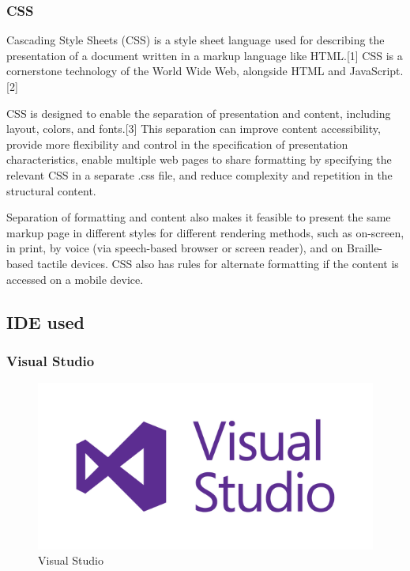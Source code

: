 \subsubsection{CSS}
Cascading Style Sheets (CSS) is a style sheet language used for describing the presentation of a document written in a markup language like HTML.[1] CSS is a cornerstone technology of the World Wide Web, alongside HTML and JavaScript.[2]

CSS is designed to enable the separation of presentation and content, including layout, colors, and fonts.[3] This separation can improve content accessibility, provide more flexibility and control in the specification of presentation characteristics, enable multiple web pages to share formatting by specifying the relevant CSS in a separate .css file, and reduce complexity and repetition in the structural content.

Separation of formatting and content also makes it feasible to present the same markup page in different styles for different rendering methods, such as on-screen, in print, by voice (via speech-based browser or screen reader), and on Braille-based tactile devices. CSS also has rules for alternate formatting if the content is accessed on a mobile device.

\subsection{IDE used}
\subsubsection{Visual Studio}

\begin{figure}[ht]
\centering
\includegraphics[scale=0.90]{images/VisualStudio.png}
\caption{Visual Studio}
\end{figure}

